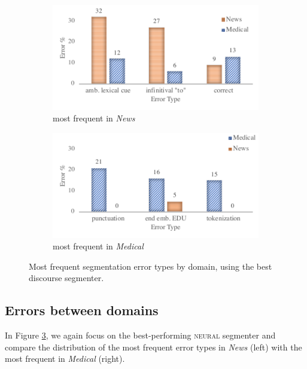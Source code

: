 \begin{figure}
\centering
\begin{subfigure}{.5\textwidth}
  \centering
  \includegraphics[width=1\linewidth]{plots/anno_errors_news.pdf}
  \vspace{-2.2em}
  \caption{most frequent in \textit{News}}
  \label{fig:errors_news}
\end{subfigure}%
\begin{subfigure}{.5\textwidth}
  \centering
  \includegraphics[width=1\linewidth]{plots/anno_errors_medical.pdf}
  \vspace{-2.2em}
  \caption{most frequent in \textit{Medical}}
  \label{fig:errors_medical}
\end{subfigure}
\caption{Most frequent segmentation error types by domain, using the best discourse segmenter.}
\label{fig:errors}
\end{figure}

\subsection{Errors between domains}

In Figure \ref{fig:errors}, we again focus on the best-performing \textsc{neural} segmenter and compare the distribution of the most frequent error types in \textit{News} (left) with the most frequent in \textit{Medical} (right). 


